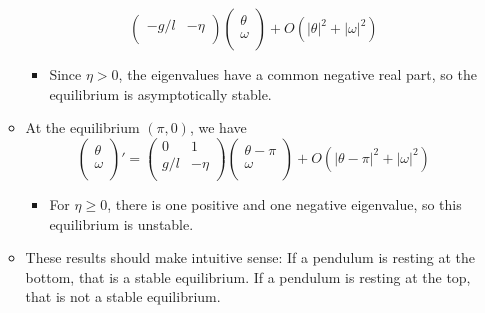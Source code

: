 \documentclass[../notes.tex]{subfiles}
\begin{document}
\begin{itemize}
\begin{itemize}
\begin{equation*}
\begin{pmatrix}
                -g/l & -\eta\\
            \end{pmatrix}
            \begin{pmatrix}
                \theta\\
                \omega\\
            \end{pmatrix}
            +O(|\theta|^2+|\omega|^2)
        \end{equation*}
        \begin{itemize}
            \item Since $\eta>0$, the eigenvalues have a common negative real part, so the equilibrium is asymptotically stable.
        \end{itemize}
        \item At the equilibrium $(\pi,0)$, we have
        \begin{equation*}
            \begin{pmatrix}
                \theta\\
                \omega\\
            \end{pmatrix}'
            =
            \begin{pmatrix}
                0 & 1\\
                g/l & -\eta\\
            \end{pmatrix}
            \begin{pmatrix}
                \theta-\pi\\
                \omega\\
            \end{pmatrix}
            +O(|\theta-\pi|^2+|\omega|^2)
        \end{equation*}
        \begin{itemize}
            \item For $\eta\geq 0$, there is one positive and one negative eigenvalue, so this equilibrium is unstable.
        \end{itemize}
        \item These results should make intuitive sense: If a pendulum is resting at the bottom, that is a stable equilibrium. If a pendulum is resting at the top, that is not a stable equilibrium.
    \end{itemize}
\end{itemize}
\end{document}
